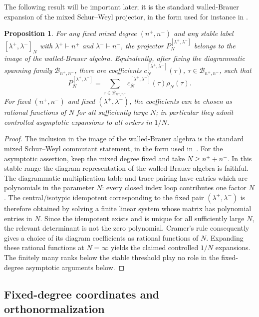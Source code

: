\documentclass[11pt,a4paper,reqno]{amsart}
\newtheorem{proposition}[theorem]{Proposition}
\theoremstyle{definition}
\theoremstyle{remark}
\begin{document}
The following result will be important later; it is the standard walled-Brauer expansion of the mixed Schur--Weyl projector, in the form used for instance in \cite{Dah26,Lem26a}.
\begin{proposition}\label{prop:expansion-projector}
For any fixed mixed degree $(n^+,n^-)$ and any stable label $[\lambda^+,\lambda^-]_N$ with $\lambda^+\vdash n^+$ and $\lambda^-\vdash n^-$, the projector $P_N^{[\lambda^+,\lambda^-]}$ belongs to the image of the walled-Brauer algebra. Equivalently, after fixing the diagrammatic spanning family $\mathcal B_{n^+,n^-}$, there are coefficients $c_N^{[\lambda^+,\lambda^-]}(\tau)$, $\tau\in\mathcal B_{n^+,n^-}$, such that
\begin{equation}\label{eq:projector-walled-brauer-expansion}
P_N^{[\lambda^+,\lambda^-]}=\sum_{\tau\in\mathcal B_{n^+,n^-}}c_N^{[\lambda^+,\lambda^-]}(\tau)\rho_N(\tau).
\end{equation}
For fixed $(n^+,n^-)$ and fixed $(\lambda^+,\lambda^-)$, the coefficients can be chosen as rational functions of $N$ for all sufficiently large $N$; in particular they admit controlled asymptotic expansions to all orders in $1/N$.
\end{proposition}

\begin{proof}
The inclusion in the image of the walled-Brauer algebra is the standard mixed Schur--Weyl commutant statement, in the form used in~\cite{Dah26,Lem26a}. For the asymptotic assertion, keep the mixed degree fixed and take $N\ge n^++n^-$. In this stable range the diagram representation of the walled-Brauer algebra is faithful. The diagrammatic multiplication table and trace pairing have entries which are polynomials in the parameter $N$: every closed index loop contributes one factor $N$. The central/isotypic idempotent corresponding to the fixed pair $(\lambda^+,\lambda^-)$ is therefore obtained by solving a finite linear system whose matrix has polynomial entries in $N$. Since the idempotent exists and is unique for all sufficiently large $N$, the relevant determinant is not the zero polynomial. Cramer's rule consequently gives a choice of its diagram coefficients as rational functions of $N$. Expanding these rational functions at $N=\infty$ yields the claimed controlled $1/N$ expansions. The finitely many ranks below the stable threshold play no role in the fixed-degree asymptotic arguments below.
\end{proof}

\subsection{Fixed-degree coordinates and orthonormalization}
\label{subsec:channel-recoupling}
\label{subsec:fixed-degree-coordinates}
\end{document}
